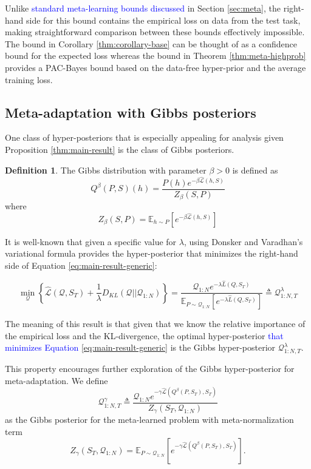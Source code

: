\documentclass{article}
\theoremstyle{definition}
\newtheorem{defn}{Definition}[section]
\newcommand{\Expect}[2]{\mathbb{E}_{#1}\left [#2 \right ]}
\newcommand{\LFe}[1]{\textcolor{blue}{#1}}
\begin{document}
Unlike \LFe{standard meta-learning bounds discussed} in Section \ref{sec:meta}, the right-hand side for this bound contains the empirical loss on data from the test task, making straightforward comparison between these bounds effectively impossible. The bound in Corollary \ref{thm:corollary-base} can be thought of as a confidence bound for the expected loss whereas the bound in Theorem \ref{thm:meta-highprob} provides a PAC-Bayes bound based on the data-free hyper-prior and the average training loss.

\subsection{Meta-adaptation with Gibbs posteriors} \label{sec:adapt-gibbs}

One class of hyper-posteriors that is especially appealing for analysis given Proposition \ref{thm:main-result} is the class of Gibbs posteriors.

\begin{defn} \label{defn:Gibbs}
	The Gibbs distribution with parameter $\beta>0$ is defined as $$Q^\beta(P,S)(h)=\frac{P(h)e^{-\beta \hat{\mathcal{L}}(h,S)}}{Z_\beta(S,P)}$$ 
	where 
	$$Z_\beta(S,P)=\Expect{h\sim P}{e^{-\beta\hat{\mathcal{L}}(h,S)}}$$
\end{defn}

It is well-known that given a specific value for $\lambda$, using Donsker and Varadhan’s variational formula \citep{Donsker1975} provides the hyper-posterior that minimizes the right-hand side of Equation \ref{eq:main-result-generic}:

$$\min_{\mathcal{Q}} \left\{ \hat{\mathcal{L}}(\mathcal{Q}, S_T) + \frac{1}{\lambda}D_{KL}(\mathcal{Q}||\mathcal{Q}_{1:N}) \right\} = \frac{\mathcal{Q}_{1:N}e^{-\lambda\hat{L}(Q,S_T)}}{\Expect{P\sim \mathcal{Q}_{1:N}}{e^{-\lambda\hat{L}(Q,S_T)}}}\triangleq \mathcal{Q}^{\lambda}_{1:N,T}$$

The meaning of this result is that given that we know the relative importance of the empirical loss and the KL-divergence, the optimal hyper-posterior \LFe{that minimizes Equation \ref{eq:main-result-generic}} is the Gibbs hyper-posterior $\mathcal{Q}^{\lambda}_{1:N,T}$.

This property encourages further exploration of the Gibbs hyper-posterior for meta-adaptation. We define 
\begin{equation} \label{eq:aml-post-defn}
\mathcal{Q}^{\gamma}_{1:N,T}\triangleq \frac{\mathcal{Q}_{1:N}e^{-\gamma\hat{\mathcal{L}}(Q^\beta(P,S_T),S_T)}}{Z_\gamma(S_T, \mathcal{Q}_{1:N})}
\end{equation} 
as the Gibbs posterior for the meta-learned problem with meta-normalization term $$Z_\gamma(S_T, \mathcal{Q}_{1:N})=\Expect{P\sim \mathcal{Q}_{1:N}}{e^{-\gamma\hat{\mathcal{L}}(Q^\beta(P,S_T),S_T)}}.$$
\end{document}
